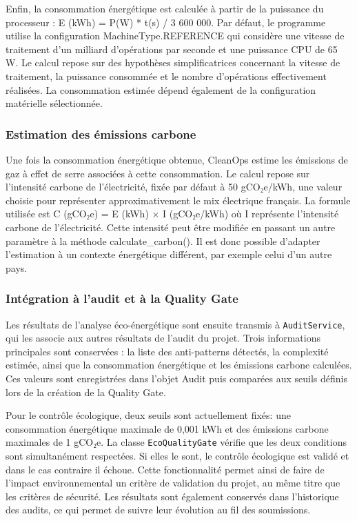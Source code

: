 \documentclass[a4paper,12pt]{article}
\begin{document}
Enfin, la consommation énergétique est calculée à partir de la puissance
du processeur : E (kWh) = P(W) * t(s) / 3 600 000. Par défaut, le
programme utilise la configuration MachineType.REFERENCE qui considère
une vitesse de traitement d'un milliard d'opérations par seconde et une
puissance CPU de 65 W. Le calcul repose sur des hypothèses
simplificatrices concernant la vitesse de traitement, la puissance
consommée et le nombre d'opérations effectivement réalisées. La
consommation estimée dépend également de la configuration matérielle
sélectionnée.

\subsubsection{Estimation des émissions
carbone}\label{estimation-des-uxe9missions-carbone}

Une fois la consommation énergétique obtenue, CleanOps estime les
émissions de gaz à effet de serre associées à cette consommation. Le
calcul repose sur l'intensité carbone de l'électricité, fixée par défaut
à 50 gCO₂e/kWh, une valeur choisie pour représenter approximativement le
mix électrique français. La formule utilisée est C (gCO₂e) = E (kWh) × I
(gCO₂e/kWh) où I représente l'intensité carbone de l'électricité. Cette
intensité peut être modifiée en passant un autre paramètre à la méthode
calculate\_carbon(). Il est donc possible d'adapter l'estimation à un
contexte énergétique différent, par exemple celui d'un autre pays.

\subsubsection{Intégration à l'audit et à la Quality
Gate}\label{intuxe9gration-uxe0-laudit-et-uxe0-la-quality-gate}

Les résultats de l'analyse éco-énergétique sont ensuite transmis à
\texttt{AuditService}, qui les associe aux autres résultats de l'audit
du projet. Trois informations principales sont conservées : la liste des
anti-patterns détectés, la complexité estimée, ainsi que la consommation
énergétique et les émissions carbone calculées. Ces valeurs sont
enregistrées dans l'objet Audit puis comparées aux seuils définis lors
de la création de la Quality Gate.

Pour le contrôle écologique, deux seuils sont actuellement fixés: une
consommation énergétique maximale de 0,001 kWh et des émissions carbone
maximales de 1 gCO₂e. La classe \texttt{EcoQualityGate} vérifie que les
deux conditions sont simultanément respectées. Si elles le sont, le
contrôle écologique est validé et dans le cas contraire il échoue. Cette
fonctionnalité permet ainsi de faire de l'impact environnemental un
critère de validation du projet, au même titre que les critères de
sécurité. Les résultats sont également conservés dans l'historique des
audits, ce qui permet de suivre leur évolution au fil des soumissions.
\end{document}
